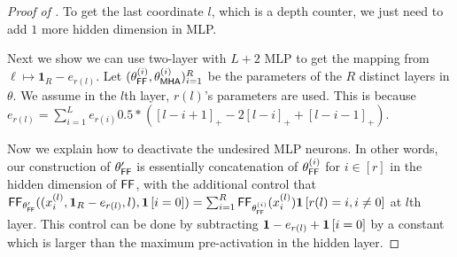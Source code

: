 \begin{proof}[Proof of ]

To get the last coordinate $l$, which is a depth counter, we just need to add $1$ more hidden dimension in MLP. 

Next we show we can use two-layer with $L+2$ MLP to get the mapping from $\ell\mapsto \bm{1}_{R} - e_{r(l)}$. Let $(\theta^{(i)}_{\mathsf{FF}},\theta^{(i)}_{\mathsf{MHA}})_{i=1}^R$ be the parameters of the $R$ distinct layers in $\theta$. We assume in the $l$th layer, $r(l)$'s parameters are used. This is because $e_{r(l)} = \sum_{i=1}^L e_{r(i)}0.5*( [l-i+1 ]_+-2[l-i]_+ + [l-i-1]_+)$.

Now we explain how to deactivate the undesired MLP neurons. In other words, our construction of $\theta'_{\mathsf{FF}} $ is essentially concatenation of $\theta^{(i)}_{\mathsf{FF}}$ for $i\in[r]$ in the hidden dimension of $\mathsf{FF}$, with the additional control that  $\mathsf{FF}_{\theta'_{\mathsf{FF}}}((x^{(l)}_i, \bm{1}_{R} - e_{r(l)},l),\bm{1}\left[i=0\right]) = \sum_{i=1}^R \mathsf{FF}_{\theta^{(i)}_{\mathsf{FF}}}(x^{(l)}_i)\bm{1}\left[r(l)=i,i\neq 0\right]$ at $l$th layer. This control can be done by subtracting $\bm{1} - e_{r(l)} + \bm{1}\left[i=0\right]$ by a constant which is larger than the maximum pre-activation in the hidden layer.


\end{proof}
